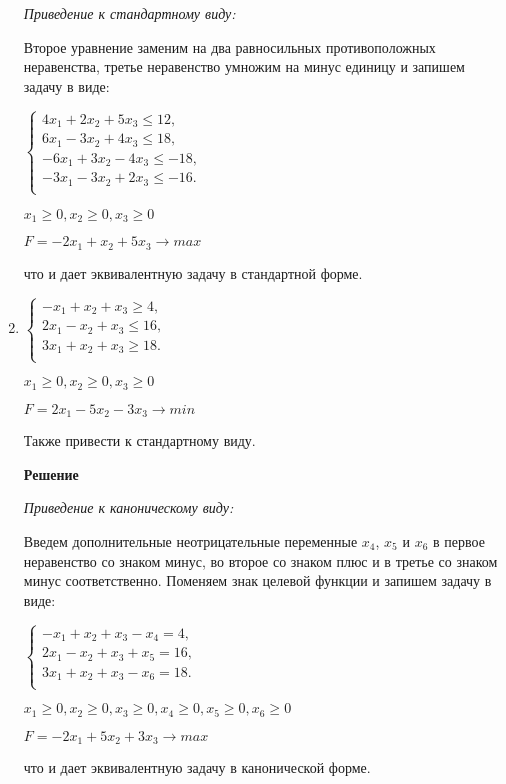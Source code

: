 \documentclass[12pt]{article}
\begin{document}
\begin{enumerate}
\textit{Приведение к стандартному виду:}

Второе уравнение заменим на два равносильных противоположных неравенства, третье неравенство умножим на минус единицу и запишем задачу в виде:
\begin{center}

$\begin{cases}
  4x_1 +2x_2+5x_3 \le 12,\\ 
 6x_1 -3x_2 +4x_3 \le 18,\\
 -6x_1 +3x_2 -4x_3 \le -18,\\
 -3x_1 -3x_2 +2x_3\le-16.\\
\end{cases}$

$x_1\ge0, x_2\ge0, x_3\ge0$

$F=-2x_1+x_2 +5x_3 \rightarrow max$
\end{center}
что и дает эквивалентную задачу в стандартной форме.
\newpage
\item
\begin{center}
$\begin{cases}
  -x_1 +x_2+x_3 \ge 4,\\ 
 2x_1 -x_2 +x_3 \le 16,\\
 3x_1 +x_2 +x_3\ge18.\\
\end{cases}$

$x_1\ge0, x_2\ge0, x_3\ge0$

$F=2x_1-5x_2- 3x_3 \rightarrow min$

Также привести к стандартному виду.
\end{center}

\textbf{Решение}

\textit{Приведение к каноническому виду:}

Введем дополнительные неотрицательные переменные $x_4$, $x_5$ и $ x_6$ в первое неравенство со знаком минус, во второе со знаком плюс  и в третье со знаком минус соответственно. Поменяем знак целевой функции и запишем задачу в виде:
\begin{center}
$\begin{cases}
  -x_1 +x_2+x_3 - x_4 = 4,\\ 
 2x_1 -x_2 +x_3 + x_5 = 16,\\
 3x_1 +x_2 +x_3 - x_6=18.\\
\end{cases}$

$x_1\ge0, x_2\ge0, x_3\ge0, x_4\ge0, x_5\ge0, x_6\ge0$

$F=-2x_1+5x_2+ 3x_3 \rightarrow max$
\end{center}
что и дает эквивалентную задачу в канонической форме.


\end{enumerate}
\end{document}
